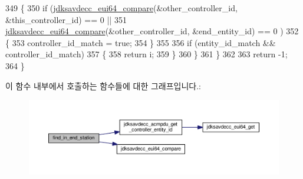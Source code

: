 \begin{DoxyCode}
349         \{
350             \textcolor{keywordflow}{if} (\hyperlink{group__eui64_ga1d7414dc665866d8ad0af100f8a52ef2}{jdksavdecc\_eui64\_compare}(&other\_controller\_id, &this\_controller\_id)
       == 0 ||
351                 \hyperlink{group__eui64_ga1d7414dc665866d8ad0af100f8a52ef2}{jdksavdecc\_eui64\_compare}(&other\_controller\_id, &end\_entity\_id) == 0
      )
352             \{
353                 controller\_id\_match = \textcolor{keyword}{true};
354             \}
355 
356             \textcolor{keywordflow}{if} (entity\_id\_match && controller\_id\_match)
357             \{
358                 \textcolor{keywordflow}{return} i;
359             \}
360         \}
361     \}
362 
363     \textcolor{keywordflow}{return} -1;
364 \}
\end{DoxyCode}


이 함수 내부에서 호출하는 함수들에 대한 그래프입니다.\+:
\nopagebreak
\begin{figure}[H]
\begin{center}
\leavevmode
\includegraphics[width=350pt]{classavdecc__lib_1_1controller__imp_a9a0d332a5f7f7d1b006f83be7a9ee5e0_cgraph}
\end{center}
\end{figure}


